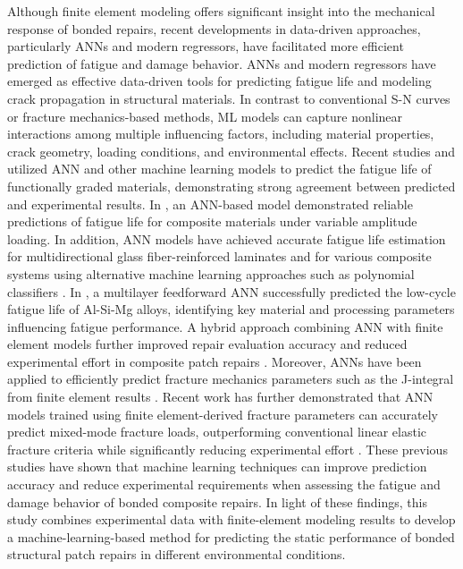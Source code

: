 \documentclass[journal,article,submit,pdftex,moreauthors]{Definitions/mdpi}
\begin{document}
Although finite element modeling offers significant insight into the mechanical response of bonded repairs, recent developments in data-driven approaches, particularly ANNs and modern regressors, have facilitated more efficient prediction of fatigue and damage behavior. ANNs and modern regressors have emerged as effective data-driven tools for predicting fatigue life and modeling crack propagation in structural materials.
In contrast to conventional S-N curves or fracture mechanics-based methods, ML models can capture nonlinear interactions among multiple influencing factors, including material properties, crack geometry, loading conditions, and environmental effects.
Recent studies \cite{Alkunte} and \cite{magliacano2026element} utilized ANN and other machine learning models to predict the fatigue life of functionally graded materials, demonstrating strong agreement between predicted and experimental results. In \cite{Rohman}, an ANN-based model demonstrated reliable predictions of fatigue life for composite materials under variable amplitude loading. In addition, ANN models have achieved accurate fatigue life estimation for multidirectional glass fiber-reinforced laminates \cite{Vassilopoulos} and for various composite systems using alternative machine learning approaches such as polynomial classifiers \cite{Kadi}. In \cite{Mishra}, a multilayer feedforward ANN successfully predicted the low-cycle fatigue life of Al-Si-Mg alloys, identifying key material and processing parameters influencing fatigue performance. A hybrid approach combining ANN with finite element models further improved repair evaluation accuracy and reduced experimental effort in composite patch repairs \cite{Zhang}. Moreover, ANNs have been applied to efficiently predict fracture mechanics parameters such as the J-integral from finite element results \cite{Mortazavi}. Recent work has further demonstrated that ANN models trained using finite element-derived fracture parameters can accurately predict mixed-mode fracture loads, outperforming conventional linear elastic fracture criteria while significantly reducing experimental effort \cite{Bahrami2023ANNFracture}. These previous studies have shown that machine learning techniques can improve prediction accuracy and reduce experimental requirements when assessing the fatigue and damage behavior of bonded composite repairs. In light of these findings, this study combines experimental data with finite-element modeling results to develop a machine-learning-based method for predicting the static performance of bonded structural patch repairs in different environmental conditions.
\end{document}
